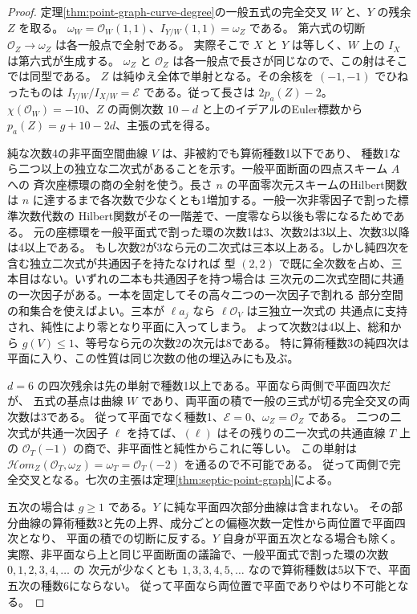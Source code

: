 \begin{proof}
定理\ref{thm:point-graph-curve-degree}の一般五式の完全交叉 $W$ と、$Y$ の残余 $Z$ を取る。
$\omega_W=\mathcal O_W(1,1)$、$I_{Y/W}(1,1)=\omega_Z$ である。
第六式の切断 $\mathcal O_Z\to\omega_Z$ は各一般点で全射である。
実際そこで $X$ と $Y$ は等しく、$W$ 上の $I_X$ は第六式が生成する。
$\omega_Z$ と $\mathcal O_Z$ は各一般点で長さが同じなので、この射はそこでは同型である。
$Z$ は純ゆえ全体で単射となる。その余核を $(-1,-1)$ でひねったものは
$I_{Y/W}/I_{X/W}=\mathcal E$ である。従って長さは $2p_a(Z)-2$。
$\chi(\mathcal O_W)=-10$、$Z$ の両側次数 $10-d$ と上のイデアルのEuler標数から
$p_a(Z)=g+10-2d$、主張の式を得る。

純な次数4の非平面空間曲線 $V$ は、非被約でも算術種数1以下であり、
種数1なら二つ以上の独立な二次式があることを示す。一般平面断面の四点スキーム $A$ への
斉次座標環の商の全射を使う。長さ $n$ の平面零次元スキームのHilbert関数は
$n$ に達するまで各次数で少なくとも1増加する。一般一次非零因子で割った標準次数代数の
Hilbert関数がその一階差で、一度零なら以後も零になるためである。
元の座標環を一般平面式で割った環の次数1は3、次数2は3以上、次数3以降は4以上である。
もし次数2が3なら元の二次式は三本以上ある。しかし純四次を含む独立二次式が共通因子を持たなければ
型 $(2,2)$ で既に全次数を占め、三本目はない。いずれの二本も共通因子を持つ場合は
三次元の二次式空間に共通の一次因子がある。一本を固定してその高々二つの一次因子で割れる
部分空間の和集合を使えばよい。三本が $\ell a_j$ なら $\ell\mathcal O_V$ は三独立一次式の
共通点に支持され、純性により零となり平面に入ってしまう。
よって次数2は4以上、総和から $g(V)\le1$、等号なら元の次数2の次元は8である。
特に算術種数3の純四次は平面に入り、この性質は同じ次数の他の埋込みにも及ぶ。

$d=6$ の四次残余は先の単射で種数1以上である。平面なら両側で平面四次だが、
五式の基点は曲線 $W$ であり、両平面の積で一般の三式が切る完全交叉の両次数は3である。
従って平面でなく種数1、$\mathcal E=0$、$\omega_Z=\mathcal O_Z$ である。
二つの二次式が共通一次因子 $\ell$ を持てば、$(\ell)$ はその残りの二一次式の共通直線 $T$ 上の
$\mathcal O_T(-1)$ の商で、非平面性と純性からこれに等しい。
この単射は $\mathcal Hom_Z(\mathcal O_T,\omega_Z)=\omega_T=\mathcal O_T(-2)$ を通るので不可能である。
従って両側で完全交叉となる。七次の主張は定理\ref{thm:septic-point-graph}による。

五次の場合は $g\ge1$ である。$Y$ に純な平面四次部分曲線は含まれない。
その部分曲線の算術種数3と先の上界、成分ごとの偏極次数一定性から両位置で平面四次となり、
平面の積での切断に反する。$Y$ 自身が平面五次となる場合も除く。
実際、非平面なら上と同じ平面断面の議論で、一般平面式で割った環の次数 $0,1,2,3,4,\ldots$ の
次元が少なくとも $1,3,3,4,5,\ldots$ なので算術種数は5以下で、平面五次の種数6にならない。
従って平面なら両位置で平面でありやはり不可能となる。


\end{proof}
